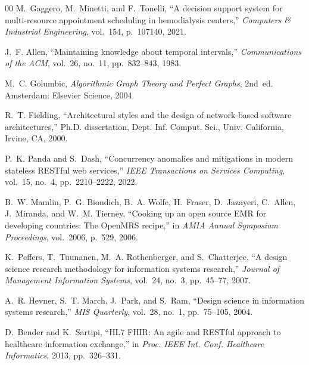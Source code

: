 \documentclass[conference]{IEEEtran}
\begin{document}
\begin{thebibliography}{00}
M.~Gaggero, M.~Minetti, and F.~Tonelli, ``A decision support system for multi-resource appointment scheduling in hemodialysis centers,'' \emph{Computers \& Industrial Engineering}, vol.~154, p.~107140, 2021.

J.~F. Allen, ``Maintaining knowledge about temporal intervals,'' \emph{Communications of the ACM}, vol.~26, no.~11, pp.~832--843, 1983.

M.~C. Golumbic, \emph{Algorithmic Graph Theory and Perfect Graphs}, 2nd~ed. Amsterdam: Elsevier Science, 2004.

R.~T. Fielding, ``Architectural styles and the design of network-based software architectures,'' Ph.D. dissertation, Dept. Inf. Comput. Sci., Univ. California, Irvine, CA, 2000.

P.~K. Panda and S.~Dash, ``Concurrency anomalies and mitigations in modern stateless {RESTful} web services,'' \emph{IEEE Transactions on Services Computing}, vol.~15, no.~4, pp.~2210--2222, 2022.

B.~W. Mamlin, P.~G. Biondich, B.~A. Wolfe, H.~Fraser, D.~Jazayeri, C.~Allen, J.~Miranda, and W.~M. Tierney, ``Cooking up an open source {EMR} for developing countries: The {OpenMRS} recipe,'' in \emph{AMIA Annual Symposium Proceedings}, vol.~2006, p.~529, 2006.

K.~Peffers, T.~Tuunanen, M.~A. Rothenberger, and S.~Chatterjee, ``A design science research methodology for information systems research,'' \emph{Journal of Management Information Systems}, vol.~24, no.~3, pp.~45--77, 2007.

A.~R. Hevner, S.~T. March, J.~Park, and S.~Ram, ``Design science in information systems research,'' \emph{MIS Quarterly}, vol.~28, no.~1, pp.~75--105, 2004.

D.~Bender and K.~Sartipi, ``{HL7 FHIR}: An agile and {RESTful} approach to healthcare information exchange,'' in \emph{Proc. IEEE Int. Conf. Healthcare Informatics}, 2013, pp.~326--331.

\end{thebibliography}
\end{document}
